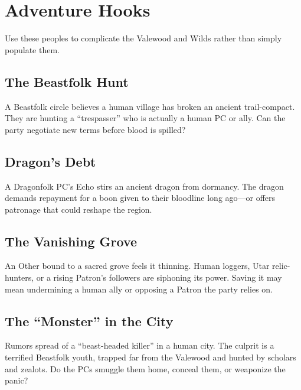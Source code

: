 \documentclass[11pt]{book}
\begin{document}
\section{Adventure Hooks}
\label{sec:nonhuman_hooks}

Use these peoples to complicate the Valewood and Wilds rather than simply populate them.

\subsection{The Beastfolk Hunt}
\label{subsec:hook_beastfolk_hunt}

A Beastfolk circle believes a human village has broken an ancient trail-compact.
They are hunting a ``trespasser'' who is actually a human PC or ally. Can the party negotiate new terms before blood is spilled?

\subsection{Dragon's Debt}
\label{subsec:hook_dragons_debt}

A Dragonfolk PC's Echo stirs an ancient dragon from dormancy. The dragon demands repayment for a boon given to their bloodline long ago---or offers patronage that could reshape the region.

\subsection{The Vanishing Grove}
\label{subsec:hook_vanishing_grove}

An Other bound to a sacred grove feels it thinning. Human loggers, Utar relic-hunters, or a rising Patron's followers are siphoning its power. Saving it may mean undermining a human ally or opposing a Patron the party relies on.

\subsection{The ``Monster'' in the City}
\label{subsec:hook_monster_city}

Rumors spread of a ``beast-headed killer'' in a human city. The culprit is a terrified Beastfolk youth, trapped far from the Valewood and hunted by scholars and zealots. Do the PCs smuggle them home, conceal them, or weaponize the panic?
\end{document}
